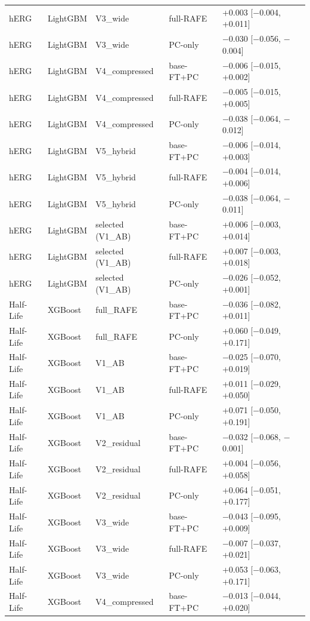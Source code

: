\begin{longtable}{lllp{2.6cm}p{4.2cm}}
hERG & LightGBM & V3\_wide & full-RAFE & +0.003 [$-$0.004, +0.011] \\
hERG & LightGBM & V3\_wide & PC-only & $-$0.030 [$-$0.056, $-$0.004] \\
hERG & LightGBM & V4\_compressed & base-FT+PC & $-$0.006 [$-$0.015, +0.002] \\
hERG & LightGBM & V4\_compressed & full-RAFE & $-$0.005 [$-$0.015, +0.005] \\
hERG & LightGBM & V4\_compressed & PC-only & $-$0.038 [$-$0.064, $-$0.012] \\
hERG & LightGBM & V5\_hybrid & base-FT+PC & $-$0.006 [$-$0.014, +0.003] \\
hERG & LightGBM & V5\_hybrid & full-RAFE & $-$0.004 [$-$0.014, +0.006] \\
hERG & LightGBM & V5\_hybrid & PC-only & $-$0.038 [$-$0.064, $-$0.011] \\
hERG & LightGBM & selected (V1\_AB) & base-FT+PC & +0.006 [$-$0.003, +0.014] \\
hERG & LightGBM & selected (V1\_AB) & full-RAFE & +0.007 [$-$0.003, +0.018] \\
hERG & LightGBM & selected (V1\_AB) & PC-only & $-$0.026 [$-$0.052, +0.001] \\
Half-Life & XGBoost & full\_RAFE & base-FT+PC & $-$0.036 [$-$0.082, +0.011] \\
Half-Life & XGBoost & full\_RAFE & PC-only & +0.060 [$-$0.049, +0.171] \\
Half-Life & XGBoost & V1\_AB & base-FT+PC & $-$0.025 [$-$0.070, +0.019] \\
Half-Life & XGBoost & V1\_AB & full-RAFE & +0.011 [$-$0.029, +0.050] \\
Half-Life & XGBoost & V1\_AB & PC-only & +0.071 [$-$0.050, +0.191] \\
Half-Life & XGBoost & V2\_residual & base-FT+PC & $-$0.032 [$-$0.068, $-$0.001] \\
Half-Life & XGBoost & V2\_residual & full-RAFE & +0.004 [$-$0.056, +0.058] \\
Half-Life & XGBoost & V2\_residual & PC-only & +0.064 [$-$0.051, +0.177] \\
Half-Life & XGBoost & V3\_wide & base-FT+PC & $-$0.043 [$-$0.095, +0.009] \\
Half-Life & XGBoost & V3\_wide & full-RAFE & $-$0.007 [$-$0.037, +0.021] \\
Half-Life & XGBoost & V3\_wide & PC-only & +0.053 [$-$0.063, +0.171] \\
Half-Life & XGBoost & V4\_compressed & base-FT+PC & $-$0.013 [$-$0.044, +0.020] \\

\end{longtable}
